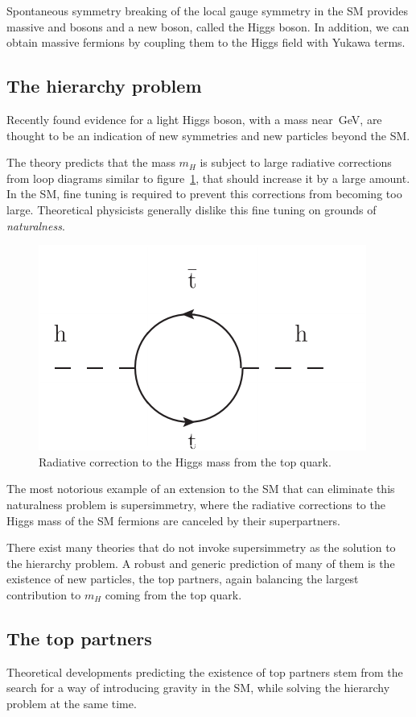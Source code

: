 Spontaneous symmetry breaking of the local gauge symmetry in the SM provides massive
\W and \Z bosons and a new boson, called the Higgs boson.
In addition, we can obtain massive fermions by coupling them to the Higgs
field with Yukawa terms.

\subsection{The hierarchy problem}
Recently found evidence for a light Higgs boson, with a mass
near~\unit[125]{GeV}, are thought to be an indication of new symmetries and
new particles beyond the SM.

The theory predicts that the mass $m_H$ is subject to large radiative
corrections from loop diagrams similar to figure~\ref{fig:higgs_correction},
that should increase it by a large amount.
In the SM, fine tuning is required to prevent this corrections from becoming
too large. Theoretical physicists generally dislike this fine tuning on grounds of
\emph{naturalness}.

\begin{figure}[htb]
    \centering
    \includegraphics[width=.4\textwidth]{images/pdf/higgs_correction}
    \caption{Radiative correction to the Higgs mass from the top quark.}
    \label{fig:higgs_correction}
\end{figure}

The most notorious example of an extension to the SM that can eliminate this
naturalness problem is supersimmetry, where the radiative corrections to
the Higgs mass of the SM fermions are canceled by their superpartners.

There exist many theories that do not invoke supersimmetry as the solution
to the hierarchy problem. A robust and generic prediction of many of them is the
existence of new particles, the top partners, again balancing the
largest contribution to $m_H$ coming from the top quark.

\subsection{The top partners}
Theoretical developments predicting the existence of top partners stem from
the search for a way of introducing gravity in the SM, while solving the
hierarchy problem at the same time.

